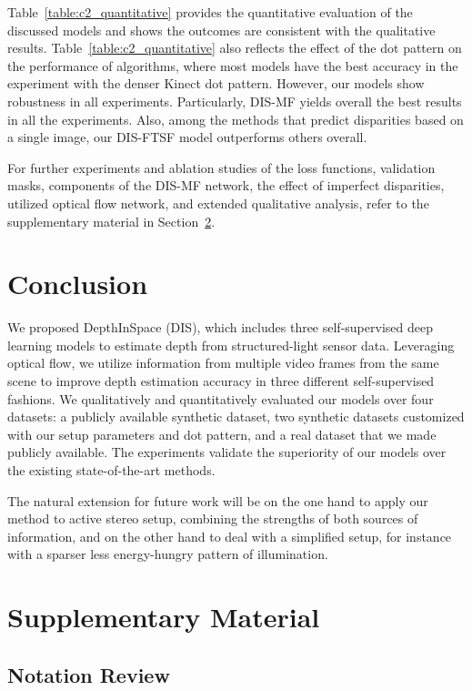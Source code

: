 Table~\ref{table:c2_quantitative} provides the quantitative evaluation of the discussed models and shows the outcomes are consistent with the qualitative results. Table~\ref{table:c2_quantitative} also reflects the effect of the dot pattern on the performance of algorithms, where most models have the best accuracy in the experiment with the denser Kinect dot pattern. However, our models show robustness in all experiments. Particularly, DIS-MF yields overall the best results in all the experiments. Also, among the methods that predict disparities based on a single image, our DIS-FTSF model outperforms others overall.

For further experiments and ablation studies of the loss functions, validation masks, components of the DIS-MF network, the effect of imperfect disparities, utilized optical flow network, and extended qualitative analysis, refer to the supplementary material in Section~\ref{sec:c2_supp}.

\section{Conclusion}

We proposed DepthInSpace (DIS), which includes three self-supervised deep learning models to estimate depth from structured-light sensor data. Leveraging optical flow, we utilize information from multiple video frames from the same scene to improve depth estimation accuracy in three different self-supervised fashions. We qualitatively and quantitatively evaluated our models over four datasets: a publicly available synthetic dataset, two synthetic datasets customized with our setup parameters and dot pattern, and a real dataset that we made publicly available. The experiments validate the superiority of our models over the existing state-of-the-art methods.

The natural extension for future work will be on the one hand to apply our method to active stereo setup, combining the strengths of both sources of information, and on the other hand to deal with a simplified setup, for instance with a sparser less energy-hungry pattern of illumination.

\section{Supplementary Material} \label{sec:c2_supp}

\subsection{Notation Review}

